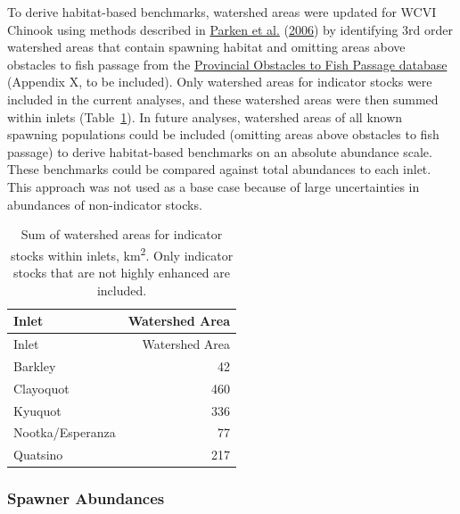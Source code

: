 \documentclass[11pt]{book}
\begin{document}
To derive habitat-based benchmarks, watershed areas were updated for WCVI Chinook using methods described in \protect\hyperlink{ref-parkenHabitatbasedMethodsEstimate2006}{Parken et al.} (\protect\hyperlink{ref-parkenHabitatbasedMethodsEstimate2006}{2006}) by identifying 3rd order watershed areas that contain spawning habitat and omitting areas above obstacles to fish passage from the \href{https://catalogue.data.gov.bc.ca/dataset/provincial-obstacles-to-fish-passage}{Provincial Obstacles to Fish Passage database} (Appendix X, to be included). Only watershed areas for indicator stocks were included in the current analyses, and these watershed areas were then summed within inlets (Table~\ref{tab:chinook-WA}). In future analyses, watershed areas of all known spawning populations could be included (omitting areas above obstacles to fish passage) to derive habitat-based benchmarks on an absolute abundance scale. These benchmarks could be compared against total abundances to each inlet. This approach was not used as a base case because of large uncertainties in abundances of non-indicator stocks.
\begin{longtable}[]{@{}lr@{}}
\caption{\label{tab:chinook-WA}Sum of watershed areas for indicator stocks within inlets, km\textsuperscript{2}. Only indicator stocks that are not highly enhanced are included.}\tabularnewline
\toprule
Inlet & Watershed Area \\
\midrule
\endfirsthead
\toprule
Inlet & Watershed Area \\
\midrule
\endhead
Barkley & 42 \\
Clayoquot & 460 \\
Kyuquot & 336 \\
Nootka/Esperanza & 77 \\
Quatsino & 217 \\
\bottomrule
\end{longtable}
\hypertarget{spawner-abundances}{%
\subsubsection{Spawner Abundances}\label{spawner-abundances}}
\end{document}
